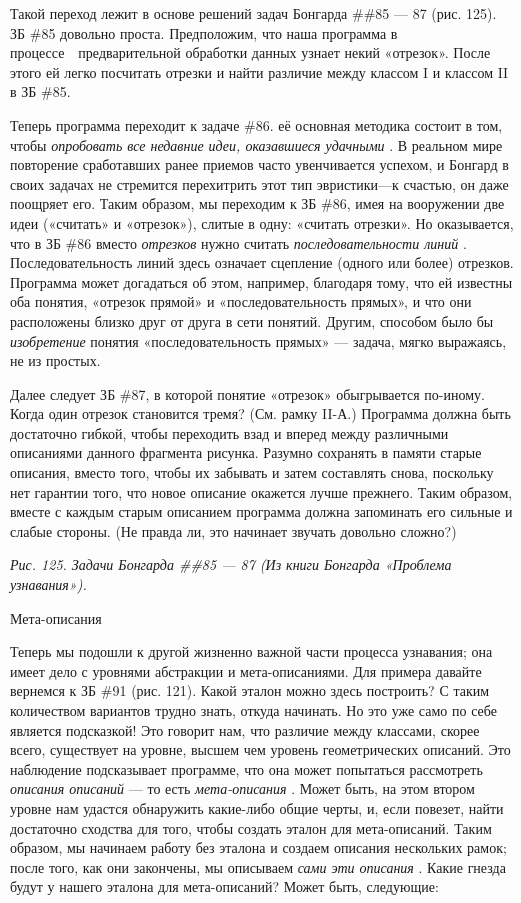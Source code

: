 \documentclass[../main.tex]{subfiles}
\begin{document}
Такой переход лежит в основе решений задач Бонгарда \#\#85 --- 87 (рис. 125). ЗБ \#85 довольно проста. Предположим, что наша программа в процессе~~предварительной обработки данных узнает некий «отрезок». После этого ей легко посчитать отрезки и найти различие между классом I и классом II в ЗБ \#85.

Теперь программа переходит к задаче \#86. её основная методика состоит в том, чтобы \emph{опробовать все недавние идеи, оказавшиеся удачными} . В реальном мире повторение сработавших ранее приемов часто увенчивается успехом, и Бонгард в своих задачах не стремится перехитрить этот тип эвристики---к счастью, он даже поощряет его. Таким образом, мы переходим к ЗБ \#86, имея на вооружении две идеи («считать» и «отрезок»), слитые в одну: «считать отрезки». Но оказывается, что в ЗБ \#86 вместо \emph{отрезков} нужно считать \emph{последовательности линий} . Последовательность линий здесь означает сцепление (одного или более) отрезков. Программа может догадаться об этом, например, благодаря тому, что ей известны оба понятия, «отрезок прямой» и «последовательность прямых», и что они расположены близко друг от друга в сети понятий. Другим, способом было бы \emph{изобретение} понятия «последовательность прямых» --- задача, мягко выражаясь, не из простых.

Далее следует ЗБ \#87, в которой понятие «отрезок» обыгрывается по-иному. Когда один отрезок становится тремя? (См. рамку II-А.) Программа должна быть достаточно гибкой, чтобы переходить взад и вперед между различными описаниями данного фрагмента рисунка. Разумно сохранять в памяти старые описания, вместо того, чтобы их забывать и затем составлять снова, поскольку нет гарантии того, что новое описание окажется лучше прежнего. Таким образом, вместе с каждым старым описанием программа должна запоминать его сильные и слабые стороны. (Не правда ли, это начинает звучать довольно сложно?)

\emph{Рис. 125. Задачи Бонгарда \#\#85 --- 87 (Из книги Бонгарда «Проблема узнавания»).}

Мета-описания

Теперь мы подошли к другой жизненно важной части процесса узнавания; она имеет дело с уровнями абстракции и мета-описаниями. Для примера давайте вернемся к ЗБ \#91 (рис. 121). Какой эталон можно здесь построить? С таким количеством вариантов трудно знать, откуда начинать. Но это уже само по себе является подсказкой! Это говорит нам, что различие между классами, скорее всего, существует на уровне, высшем чем уровень геометрических описаний. Это наблюдение подсказывает программе, что она может попытаться рассмотреть \emph{описания описаний} --- то есть \emph{мета-описания} . Может быть, на этом втором уровне нам удастся обнаружить какие-либо общие черты, и, если повезет, найти достаточно сходства для того, чтобы создать эталон для мета-описаний. Таким образом, мы начинаем работу без эталона и создаем описания нескольких рамок; после того, как они закончены, мы описываем \emph{сами эти описания} . Какие гнезда будут у нашего эталона для мета-описаний? Может быть, следующие:
\end{document}
